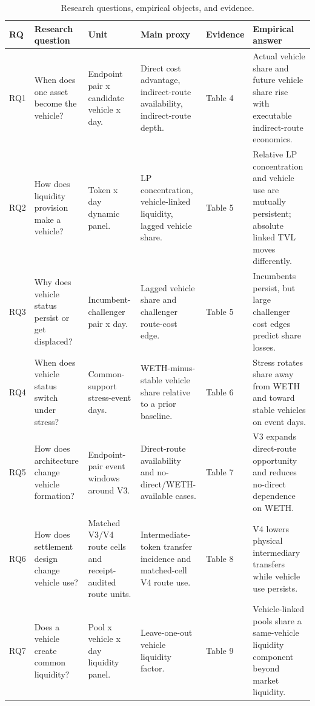 \documentclass[12pt]{article}
\begin{document}
\begin{landscape}
\begin{table}[!htbp]
\centering
\scriptsize
\setlength{\tabcolsep}{2.5pt}
\begin{threeparttable}
\caption{Research questions, empirical objects, and evidence.}
\label{tab:rq-evidence-map}
\begin{tabular}{@{}>{\raggedright\arraybackslash}p{}>{\raggedright\arraybackslash}p{}>{\raggedright\arraybackslash}p{}>{\raggedright\arraybackslash}p{}>{\raggedright\arraybackslash}p{}>{\raggedright\arraybackslash}p{}@{}}
\toprule
RQ & Research question & Unit & Main proxy & Evidence & Empirical answer \\
\midrule
RQ1 & When does one asset become the vehicle? & Endpoint pair x candidate vehicle x day. & Direct cost advantage, indirect-route availability, indirect-route depth. & Table 4 & Actual vehicle share and future vehicle share rise with executable indirect-route economics. \\
RQ2 & How does liquidity provision make a vehicle? & Token x day dynamic panel. & LP concentration, vehicle-linked liquidity, lagged vehicle share. & Table 5 & Relative LP concentration and vehicle use are mutually persistent; absolute linked TVL moves differently. \\
RQ3 & Why does vehicle status persist or get displaced? & Incumbent-challenger pair x day. & Lagged vehicle share and challenger route-cost edge. & Table 5 & Incumbents persist, but large challenger cost edges predict share losses. \\
RQ4 & When does vehicle status switch under stress? & Common-support stress-event days. & WETH-minus-stable vehicle share relative to a prior baseline. & Table 6 & Stress rotates share away from WETH and toward stable vehicles on event days. \\
RQ5 & How does architecture change vehicle formation? & Endpoint-pair event windows around V3. & Direct-route availability and no-direct/WETH-available cases. & Table 7 & V3 expands direct-route opportunity and reduces no-direct dependence on WETH. \\
RQ6 & How does settlement design change vehicle use? & Matched V3/V4 route cells and receipt-audited route units. & Intermediate-token transfer incidence and matched-cell V4 route use. & Table 8 & V4 lowers physical intermediary transfers while vehicle use persists. \\
RQ7 & Does a vehicle create common liquidity? & Pool x vehicle x day liquidity panel. & Leave-one-out vehicle liquidity factor. & Table 9 & Vehicle-linked pools share a same-vehicle liquidity component beyond market liquidity. \\

\end{tabular}
\end{threeparttable}
\end{table}
\end{landscape}
\end{document}
